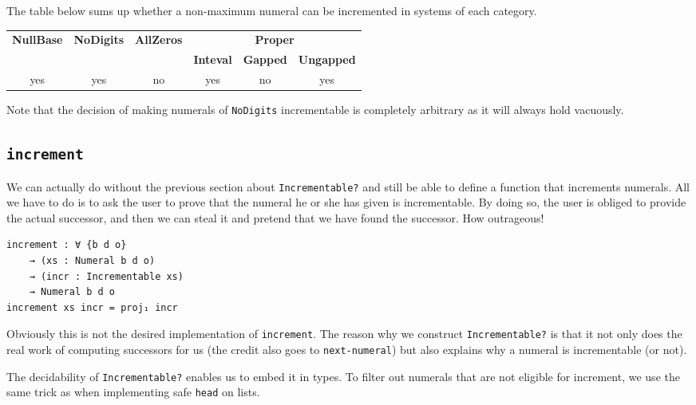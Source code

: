\documentclass[\main/thesis.tex]{subfiles}
\begin{document}
The table below sums up whether a non-maximum numeral can be incremented in
systems of each category.

\begin{center}
    \begin{adjustbox}{max width=\textwidth}
    \begin{tabular}{|c|c|c|c|c|c|}
        \hline
        \multirow{2}{*}{\textbf{NullBase}} &
        \multirow{2}{*}{\textbf{NoDigits}} &
        \multirow{2}{*}{\textbf{AllZeros}} &
        \multicolumn{3}{c|}{\textbf{Proper}} \\
        \cline{4 - 6}
        & & & \textbf{Inteval} & \textbf{Gapped} & \textbf{Ungapped} \\
        \hline
        yes & yes & no & yes & no & yes \\
        \hline
    \end{tabular}
    \end{adjustbox}
\end{center}

Note that the decision of making numerals of \lstinline{NoDigits} incrementable
is completely arbitrary as it will always hold vacuously.

\subsection{\lstinline|increment|}

We can actually do without the previous section about \lstinline|Incrementable?|
and still be able to define a function that increments numerals.
All we have to do is to ask the user to prove that the numeral he or she has
given is incrementable.
By doing so, the user is obliged to provide the actual successor,
and then we can steal it and pretend that we have found the successor.
How outrageous!

\begin{lstlisting}
increment : ∀ {b d o}
    → (xs : Numeral b d o)
    → (incr : Incrementable xs)
    → Numeral b d o
increment xs incr = proj₁ incr
\end{lstlisting}

Obviously this is not the desired implementation of \lstinline|increment|.
The reason why we construct \lstinline|Incrementable?| is that it not only
does the real work of computing successors for us (the credit also goes to \lstinline|next-numeral|)
but also explains why a numeral is incrementable (or not).

The decidability of \lstinline|Incrementable?| enables us to embed it in types.
To filter out numerals that are not eligible for increment, we use the same trick
as when implementing safe \lstinline|head| on lists.
\end{document}
